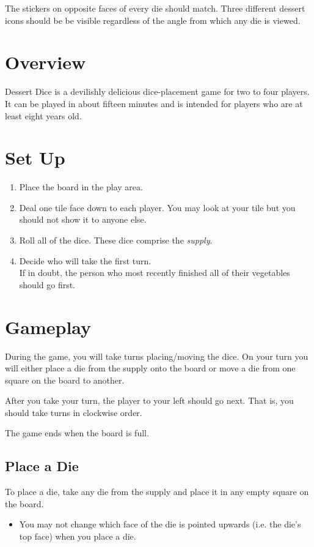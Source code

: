 \documentclass[11pt, parskip=half]{scrartcl}
\begin{document}
The stickers on opposite faces of every die should match. Three different dessert icons should be be visible regardless of the angle from which any die is viewed.

\newpage
\section*{Overview}
Dessert Dice is a devilishly delicious dice-placement game for two to four players. It can be played in about fifteen minutes and is intended for players who are at least eight years old.

\section*{Set Up}
\begin{enumerate}[leftmargin=*]
  \item Place the board in the play area.
  \item Deal one tile face down to each player. You may look at your tile but you should not show it to anyone else.
  \item Roll all of the dice. These dice comprise the \emph{supply}.
  \item Decide who will take the first turn.\\If in doubt, the person who most recently finished all of their vegetables should go first. 
 \end{enumerate}
 
\newpage
\section*{Gameplay}
During the game, you will take turns placing/moving the dice. On your turn you will either place a die from the supply onto the board or move a die from one square on the board to another.

After you take your turn, the player to your left should go next. That is, you should take turns in clockwise order.

The game ends when the board is full. 

\subsection*{Place a Die}
To place a die, take any die from the supply and place it in any empty square on the board.

\begin{itemize}[leftmargin=*]
	\item You may not change which face of the die is pointed upwards (i.e. the die's top face) when you place a die.
\end{itemize}
\end{document}

